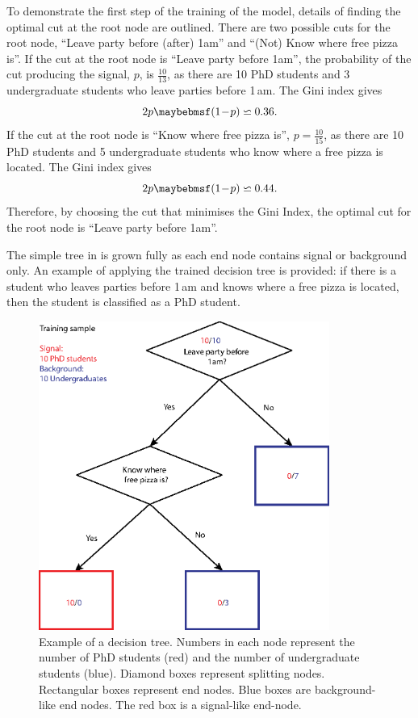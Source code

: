 To demonstrate the first step of the training of the model, details of finding the optimal cut at the root node are outlined. There are two possible cuts for the root node, ``Leave party before (after) 1am'' and ``(Not) Know where free pizza is''. If the cut at the root node is ``Leave party before 1am'', the probability of the cut producing the signal, $p$, is $\frac{10}{13}$, as there are 10 PhD students and 3 undergraduate students who leave parties before 1\,am. The Gini index gives
\begin{equation}
2p\parenths{1\!-\!p} \backsimeq 0.36 .
\end{equation}
If the cut at the root node is ``Know where free pizza is'', $p=\frac{10}{15}$, as there are  10 PhD students and 5 undergraduate students who know where a free pizza is located. The Gini index gives
\begin{equation}
2p\parenths{1\!-\!p} \backsimeq 0.44 .
\end{equation}
Therefore, by choosing the cut that minimises the Gini Index, the optimal cut for the root node is ``Leave party before 1am''.

The simple tree in  is grown fully as each end node contains signal or background only. An example of applying the trained decision tree is provided: if there is a student who leaves parties before 1\,am and knows where a free pizza is located, then the student is classified as a PhD student.




\begin{figure}[!htbp]
\includegraphics[width=0.85\textwidth]{doubleHiggs/mva/BDTcomic}
\caption[Example of a decision tree. ]
{Example of a decision tree. Numbers in each node represent the number of PhD students (red) and the number of undergraduate students (blue). Diamond boxes represent splitting nodes. Rectangular boxes represent end nodes. Blue boxes are background-like end nodes. The red box is a signal-like end-node.}
   \label{fig:doubleHiggsMVAdecisionTree}
\end{figure}


